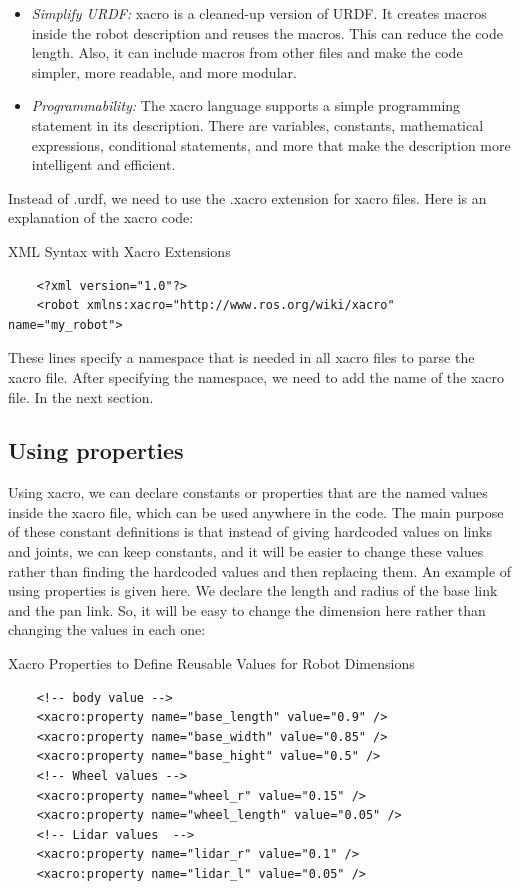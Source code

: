 \documentclass[../../main]{subfiles}
\begin{document}
\begin{itemize}
    \item \emph{Simplify URDF:} xacro is a cleaned-up version of URDF. It creates macros inside the robot description and reuses the macros. This can reduce the code length. Also, it can include macros from other files and make the code simpler, more readable, and more modular.
    \item \emph{Programmability:} The xacro language supports a simple programming statement in its description. There are variables, constants, mathematical expressions, conditional statements, and more that make the description more intelligent and efficient.
\end{itemize}

Instead of .urdf, we need to use the .xacro extension for xacro files.
Here is an explanation of the xacro code:
\begin{codebox}[]{XML Syntax with Xacro Extensions}
  \begin{verbatim}
    <?xml version="1.0"?>
    <robot xmlns:xacro="http://www.ros.org/wiki/xacro" name="my_robot">
\end{verbatim}
  \end{codebox}
These lines specify a namespace that is needed in all xacro files to parse the xacro file.
After specifying the namespace, we need to add the name of the xacro file. In the next section.

\subsection{Using properties}
Using xacro, we can declare constants or properties that are the named values inside the
xacro file, which can be used anywhere in the code. The main purpose of these constant
definitions is that instead of giving hardcoded values on links and joints, we can keep
constants, and it will be easier to change these values rather than finding the hardcoded
values and then replacing them.
An example of using properties is given here. We declare the length and radius of the
base link and the pan link. So, it will be easy to change the dimension here rather than
changing the values in each one:
\begin{codebox}[]{Xacro Properties to Define Reusable Values for Robot Dimensions}
  \begin{verbatim}
    <!-- body value -->
    <xacro:property name="base_length" value="0.9" />
    <xacro:property name="base_width" value="0.85" />
    <xacro:property name="base_hight" value="0.5" />
    <!-- Wheel values -->
    <xacro:property name="wheel_r" value="0.15" />
    <xacro:property name="wheel_length" value="0.05" />
    <!-- Lidar values  -->
    <xacro:property name="lidar_r" value="0.1" />
    <xacro:property name="lidar_l" value="0.05" />
\end{verbatim}
\end{codebox}
\end{document}
